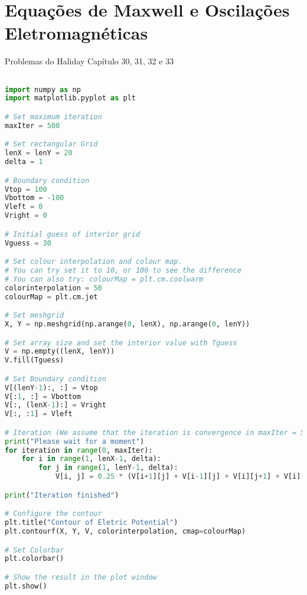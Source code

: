 \chapter{Equações de Maxwell e Oscilações Eletromagnéticas}
Problemas do Haliday Capítulo 30, 31, 32 e 33

\begin{lstlisting}[language=Python, frame=lines, basicstyle=\footnotesize, caption={Equação de Laplace}, label={lst:laplace}]

import numpy as np
import matplotlib.pyplot as plt

# Set maximum iteration
maxIter = 500

# Set rectangular Grid
lenX = lenY = 20
delta = 1

# Boundary condition
Vtop = 100
Vbottom = -100
Vleft = 0
Vright = 0

# Initial guess of interior grid
Vguess = 30

# Set colour interpolation and colour map.
# You can try set it to 10, or 100 to see the difference
# You can also try: colourMap = plt.cm.coolwarm
colorinterpolation = 50
colourMap = plt.cm.jet

# Set meshgrid
X, Y = np.meshgrid(np.arange(0, lenX), np.arange(0, lenY))

# Set array size and set the interior value with Tguess
V = np.empty((lenX, lenY))
V.fill(Tguess)

# Set Boundary condition
V[(lenY-1):, :] = Vtop
V[:1, :] = Vbottom
V[:, (lenX-1):] = Vright
V[:, :1] = Vleft

# Iteration (We assume that the iteration is convergence in maxIter = 500)
print("Please wait for a moment")
for iteration in range(0, maxIter):
    for i in range(1, lenX-1, delta):
        for j in range(1, lenY-1, delta):
            V[i, j] = 0.25 * (V[i+1][j] + V[i-1][j] + V[i][j+1] + V[i][j-1])

print("Iteration finished")

# Configure the contour
plt.title("Contour of Eletric Potential")
plt.contourf(X, Y, V, colorinterpolation, cmap=colourMap)

# Set Colorbar
plt.colorbar()

# Show the result in the plot window
plt.show()

\end{lstlisting}